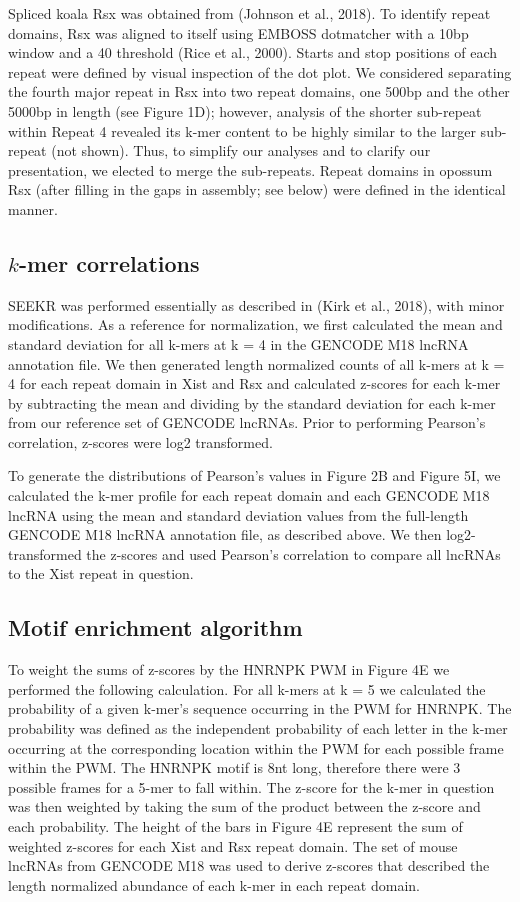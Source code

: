 Spliced koala Rsx was obtained from (Johnson et al., 2018). To identify repeat domains, Rsx was aligned to itself using EMBOSS dotmatcher with a 10bp window and a 40 threshold (Rice et al., 2000). Starts and stop positions of each repeat were defined by visual inspection of the dot plot. We considered separating the fourth major repeat in Rsx into two repeat domains, one 500bp and the other 5000bp in length (see Figure 1D); however, analysis of the shorter sub-repeat within Repeat 4 revealed its k-mer content to be highly similar to the larger sub-repeat (not shown). Thus, to simplify our analyses and to clarify our presentation, we elected to merge the sub-repeats. Repeat domains in opossum Rsx (after filling in the gaps in assembly; see below) were defined in the identical manner.

\subsection{$k$-mer correlations}
SEEKR was performed essentially as described in (Kirk et al., 2018), with minor modifications. As a reference for normalization, we first calculated the mean and standard deviation for all k-mers at k = 4 in the GENCODE M18 lncRNA annotation file. We then generated length normalized counts of all k-mers at k = 4 for each repeat domain in Xist and Rsx and calculated z-scores for each k-mer by subtracting the mean and dividing by the standard deviation for each k-mer from our reference set of GENCODE lncRNAs. Prior to performing Pearson’s correlation, z-scores were log2 transformed. 

To generate the distributions of Pearson’s values in Figure 2B and Figure 5I, we calculated the k-mer profile for each repeat domain and each GENCODE M18 lncRNA using the mean and standard deviation values from the full-length GENCODE M18 lncRNA annotation file, as described above. We then log2-transformed the z-scores and used Pearson’s correlation to compare all lncRNAs to the Xist repeat in question. 
\subsection{Motif enrichment algorithm}
To weight the sums of z-scores by the HNRNPK PWM in Figure 4E we performed the following calculation. For all k-mers at k = 5 we calculated the probability of a given k-mer’s sequence occurring in the PWM for HNRNPK. The probability was defined as the independent probability of each letter in the k-mer occurring at the corresponding location within the PWM for each possible frame within the PWM. The HNRNPK motif is 8nt long, therefore there were 3 possible frames for a 5-mer to fall within. The z-score for the k-mer in question was then weighted by taking the sum of the product between the z-score and each probability. The height of the bars in Figure 4E represent the sum of weighted z-scores for each Xist and Rsx repeat domain. The set of mouse lncRNAs from GENCODE M18 was used to derive z-scores that described the length normalized abundance of each k-mer in each repeat domain.  

\begin{singlespace}
\printbibliography[heading=bibintoc,title={References}]
\end{singlespace}